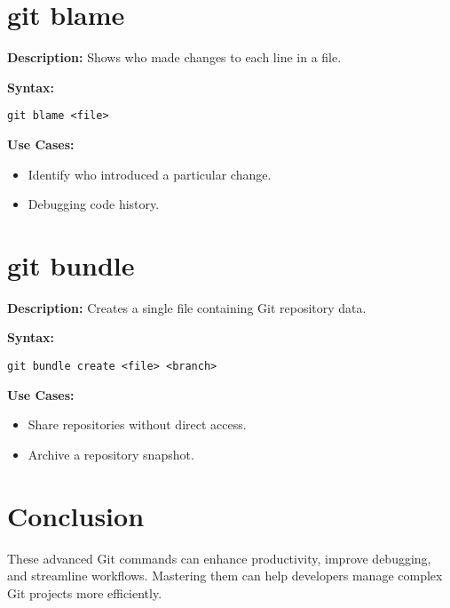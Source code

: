 \documentclass{article}
\begin{document}
\section{git blame}
\textbf{Description:} Shows who made changes to each line in a file.

\textbf{Syntax:}
\begin{lstlisting}
git blame <file>
\end{lstlisting}

\textbf{Use Cases:}
\begin{itemize}
    \item Identify who introduced a particular change.
    \item Debugging code history.
\end{itemize}

\section{git bundle}
\textbf{Description:} Creates a single file containing Git repository data.

\textbf{Syntax:}
\begin{lstlisting}
git bundle create <file> <branch>
\end{lstlisting}

\textbf{Use Cases:}
\begin{itemize}
    \item Share repositories without direct access.
    \item Archive a repository snapshot.
\end{itemize}

\section{Conclusion}
These advanced Git commands can enhance productivity, improve debugging, and streamline workflows. Mastering them can help developers manage complex Git projects more efficiently.
\end{document}

